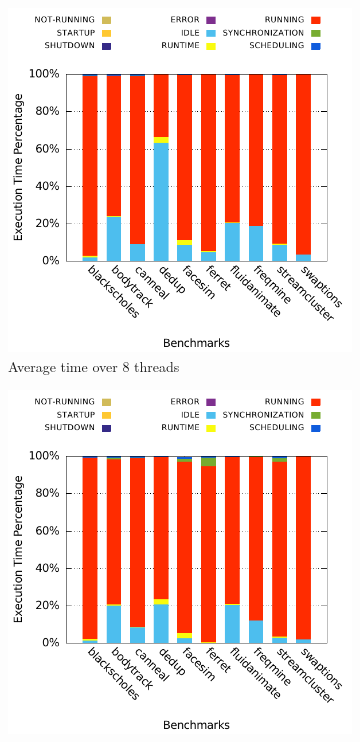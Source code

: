 \begin{figure}[p]
  \centering
  \begin{subfigure}{0.75\textwidth}
                \includegraphics[width=\textwidth]{ifcg/figures/worker-runtime-breakdowns-8}
                \caption{Average time over 8 threads}
                \label{fig:runtime_breakdown_8}
  \end{subfigure}
	\hfill
  \begin{subfigure}{0.75\textwidth}
                \includegraphics[width=\textwidth]{ifcg/figures/master-runtime-breakdowns-8}

\end{subfigure}
\end{figure}
